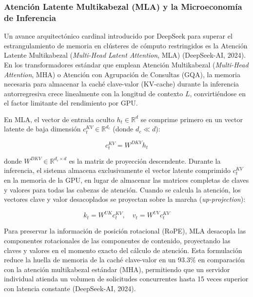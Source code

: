 \subsubsection{Atención Latente Multikabezal (MLA) y la Microeconomía de Inferencia}

Un avance arquitectónico cardinal introducido por DeepSeek para superar el estrangulamiento de memoria en clústeres de cómputo restringidos es la Atención Latente Multikabezal (\textit{Multi-Head Latent Attention}, MLA) (DeepSeek-AI, 2024). En los transformadores estándar que emplean Atención Multikabezal (\textit{Multi-Head Attention}, MHA) o Atención con Agrupación de Consultas (GQA), la memoria necesaria para almacenar la caché clave-valor (KV-cache) durante la inferencia autorregresiva crece linealmente con la longitud de contexto $L$, convirtiéndose en el factor limitante del rendimiento por GPU.

En MLA, el vector de entrada oculto $h_t \in \mathbb{R}^d$ se comprime primero en un vector latente de baja dimensión $c_t^{KV} \in \mathbb{R}^{d_c}$ (donde $d_c \ll d$):

\begin{equation}
    c_t^{KV} = W^{DKV} h_t
    \label{eq:mla_compression}
\end{equation}

donde $W^{DKV} \in \mathbb{R}^{d_c \times d}$ es la matriz de proyección descendente. Durante la inferencia, el sistema almacena exclusivamente el vector latente comprimido $c_t^{KV}$ en la memoria de la GPU, en lugar de almacenar las matrices completas de claves y valores para todas las cabezas de atención. Cuando se calcula la atención, los vectores clave y valor desacoplados se proyectan sobre la marcha (\textit{up-projection}):

\begin{equation}
    k_t = W^{UK} c_t^{KV}, \quad v_t = W^{UV} c_t^{KV}
    \label{eq:mla_up_projection}
\end{equation}

Para preservar la información de posición rotacional (RoPE), MLA desacopla las componentes rotacionales de las componentes de contenido, proyectando las claves y valores en el momento exacto del cálculo de atención. Esta formulación reduce la huella de memoria de la caché clave-valor en un $93.3\%$ en comparación con la atención multikabezal estándar (MHA), permitiendo que un servidor individual atienda un volumen de solicitudes concurrentes hasta 15 veces superior con latencia constante (DeepSeek-AI, 2024).


